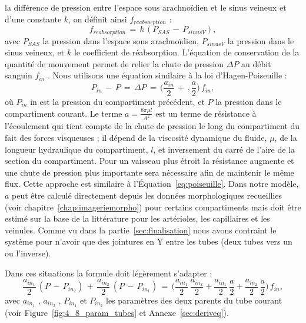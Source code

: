 la différence de pression entre l’espace sous arachnoïdien et le sinus veineux et d’une constante $k$, on
définit ainsi $f_{reabsorption}$ :
\begin{equation}
f_{reabsorption}\,=\,k\,(P_{SAS}\,-\,P_{sinusV}),
\end{equation}
avec $P_{SAS}$ la pression dans l’espace sous arachnoïdien, $P_{sinusV}$ la pression dans le sinus veineux, et $k$
le coefficient de réabsorption.
L’équation de conservation de la quantité de mouvement permet de relier la chute de pression
$\Delta P$ au débit sanguin $f_{in}$ . Nous utilisons une équation similaire à la loi d’Hagen-Poiseuille :
\begin{equation}
\label{eq:flux}
P_{in}\,-\,P\,=\,\Delta P\,=\,\biggl(\frac{a_{in}}{2}\,+\,,\frac{a}{2}\biggr)\,f_{in},
\end{equation}
où $P_{in}$ in est la pression du compartiment précédent, et $P$ la pression dans le compartiment courant. Le
terme $a=\frac{8\pi \mu l}{A^2}$ est un terme de résistance à l’écoulement qui tient compte de la chute de pression le long du
compartiment du fait des forces visqueuses ; il dépend de la viscosité dynamique du fluide, $\mu$, de la
longueur hydraulique du compartiment, $l$, et inversement du carré de l’aire de la section du compartiment. Pour un
vaisseau plus étroit la résistance augmente et une chute de pression plus importante sera nécessaire
afin de maintenir le même flux. Cette approche est similaire à l’Équation~\ref{eq:poiseuille}. Dans notre modèle, $a$
peut être calculé directement depuis les données morphologiques recueillies (voir chapitre~\ref{chap:imageriemorpho}) pour
certains compartiments mais doit être estimé sur la base de la littérature pour les artérioles, les
capillaires et les veinules. Comme vu dans la partie~\ref{sec:finalisation} nous avons contraint le système pour n’avoir
que des jointures en Y entre les tubes (deux tubes vers un ou l’inverse).

Dans ces situations la formule doit légèrement s’adapter :
\begin{equation}
\label{eq:ley}
\frac{a_{in_1}}{2}\,(P\,-\,P_{in_2})\,+\,\frac{a_{in_2}}{2}\,(P\,-\,P_{in_1})\,=\,\biggl(\frac{a_{in_1}}{2}\,\frac{a_{in_2}}{2}+\frac{a_{in_1}}{2}\,\frac{a}{2}+\frac{a_{in_2}}{2}\,\frac{a}{2}\biggr)\,f_{in},
\end{equation}
avec $a_{in_1}$ , $a_{in_2}$ , $P_{in_1}$ et $P_{in_2}$ les paramètres des deux parents du tube courant (voir Figure~\ref{fig:4_8_param_tubes} et Annexe~\ref{sec:deriveq}).

